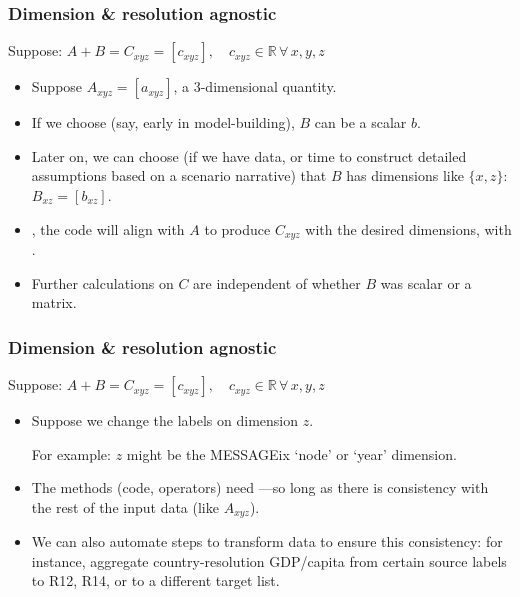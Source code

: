 \documentclass[12pt,aspectratio=169]{beamer}
\begin{document}
\begin{frame}
\frametitle{Dimension \& resolution agnostic}
Suppose: $A + B = C_{xyz} = [ c_{xyz} ], \quad c_{xyz} \in \mathbb{R} \, \forall \, x, y, z$

\bigskip
{}
\begin{itemize}
  \item Suppose $A_{xyz} = [ a_{xyz} ]$, a 3-dimensional quantity.
  \item If we choose (say, early in model-building), $B$ can be a scalar $b$.
  \item Later on, we can choose (if we have data, or time to construct detailed assumptions based on a scenario narrative) that $B$ has dimensions like $\{x, z\}$: $B_{xz} = [ b_{xz} ]$.
  \item {}, the code will align with $A$ to produce $C_{xyz}$ with the desired dimensions, with .
  \item Further calculations on $C$ are independent of whether $B$ was scalar or a matrix.
\end{itemize}
\end{frame}

\begin{frame}
\frametitle{Dimension \& resolution agnostic}
Suppose: $A + B = C_{xyz} = [ c_{xyz} ], \quad c_{xyz} \in \mathbb{R} \, \forall \, x, y, z$

\bigskip
{}
\begin{itemize}
  \item Suppose we change the labels on dimension $z$.

  For example: $z$ might be the MESSAGEix ‘node’ or ‘year’ dimension.
  \item The methods (code, operators) need —so long as there is consistency with the rest of the input data (like $A_{xyz}$).
  \item We can also automate steps to transform data to ensure this consistency: for instance, aggregate country-resolution GDP/capita from certain source labels to R12, R14, or to a different target list.
\end{itemize}
\end{frame}
\end{document}
